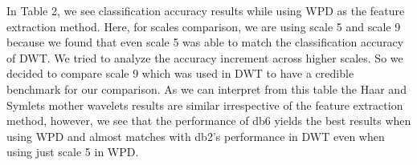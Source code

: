 \documentclass[10pt,twocolumn,letterpaper]{article}
\begin{document}
In Table 2, we see classification accuracy results while using WPD as the feature extraction method. Here, for scales comparison, we are using scale 5 and scale 9 because we found that even scale 5 was able to match the classification accuracy of DWT. We tried to analyze the accuracy increment across higher scales. So we decided to compare scale 9 which was used in DWT to have a credible benchmark for our comparison. As we can interpret from this table the Haar and Symlets mother wavelets results are similar irrespective of the feature extraction method, however, we see that the performance of db6 yields the best results when using WPD and almost matches with db2's performance in DWT even when using just scale 5 in WPD.\\


\end{document}
